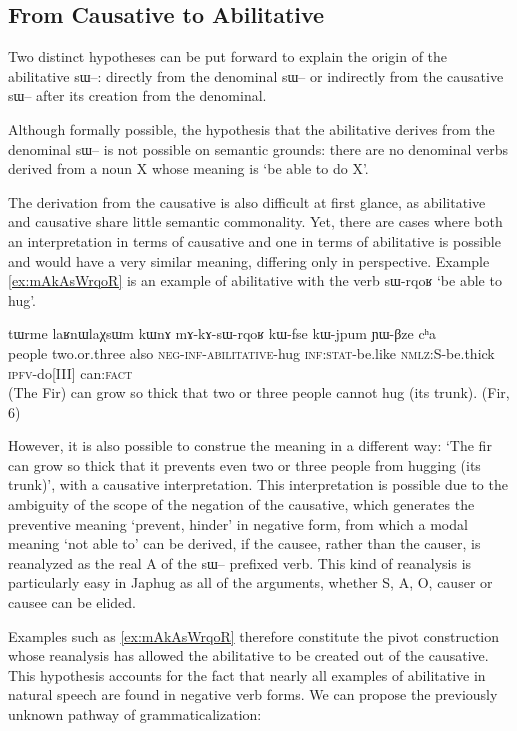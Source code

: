 \documentclass[oldfontcommands,oneside,a4paper,11pt]{article}
\newcommand{\ipa}[1]{{\phon \mbox{#1}}} %
\begin{document}
\subsection{From Causative to Abilitative}

Two distinct hypotheses can be put forward to explain the origin of the abilitative \ipa{sɯ--}: directly from the denominal \ipa{sɯ--} or indirectly from the causative \ipa{sɯ--} after its creation from the denominal. 

Although formally possible, the hypothesis that the abilitative derives from the denominal \ipa{sɯ--} is not possible on semantic grounds: there are no denominal verbs derived from a noun X whose meaning is `be able to do X'.

The derivation from the causative is also difficult at first glance, as abilitative and causative share little semantic commonality. Yet, there are cases where both an interpretation in terms of causative and one in terms of abilitative is possible and would have a very similar meaning, differing only in perspective. Example \ref{ex:mAkAsWrqoR} is an example of abilitative with the verb \ipa{sɯ-rqoʁ} `be able to hug'.


 \begin{exe}
\ex \label{ex:mAkAsWrqoR}
\gll
\ipa{tɯrme} 	\ipa{laʁnɯlaχsɯm} 	\ipa{kɯnɤ} 	\ipa{mɤ-kɤ-sɯ-rqoʁ} 	\ipa{kɯ-fse} 	\ipa{kɯ-jpum} 	\ipa{ɲɯ-βze} 	\ipa{cʰa} \\
people two.or.three also \textsc{neg-inf-abilitative}-hug \textsc{inf:stat}-be.like \textsc{nmlz:S}-be.thick \textsc{ipfv}-do[III] can\textsc{:fact} \\
\glt  (The Fir) can grow so thick that two or three people cannot hug (its trunk). (Fir, 6)
   \end{exe}

However, it is also possible to construe the meaning in a different way: `The fir can grow so thick that it prevents even two or three people from hugging (its trunk)', with a causative interpretation. This interpretation is possible due to the ambiguity of the scope of the negation of the causative, which generates the preventive meaning `prevent, hinder' in negative form, from which a modal meaning `not able to' can be derived, if the causee, rather than the causer, is reanalyzed as the real A of the \ipa{sɯ--} prefixed verb. This kind of reanalysis is particularly easy in Japhug as all of the arguments, whether S, A, O, causer or causee can be elided.

Examples such as \ref{ex:mAkAsWrqoR} therefore constitute the pivot construction whose reanalysis has allowed the abilitative to be created out of the causative. This hypothesis accounts for the fact that nearly all examples of abilitative in natural speech are found in negative verb forms. We can propose the previously unknown pathway of grammaticalization:
\end{document}
